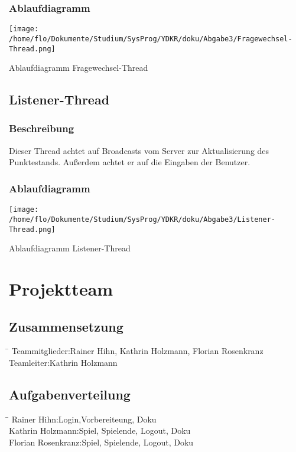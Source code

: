 \documentclass[a4paper,10pt]{article}
\begin{document}
\subsubsection{Ablaufdiagramm}

\begin{center}
 \texttt{[image: /home/flo/Dokumente/Studium/SysProg/YDKR/doku/Abgabe3/Fragewechsel-Thread.png]}
\end{center}

Ablaufdiagramm Fragewechsel-Thread

\subsection{Listener-Thread}

\subsubsection{Beschreibung}

Dieser Thread achtet auf Broadcasts vom Server zur Aktualisierung des Punktestands. Außerdem achtet er auf die Eingaben der Benutzer.

\subsubsection{Ablaufdiagramm}

\begin{center}
 \texttt{[image: /home/flo/Dokumente/Studium/SysProg/YDKR/doku/Abgabe3/Listener-Thread.png]}
\end{center}

Ablaufdiagramm Listener-Thread

\section{Projektteam}

\subsection{Zusammensetzung}

\begin{tabbing}
\hspace{3,5 cm}\=\kill
Teammitglieder:\>Rainer Hihn, Kathrin Holzmann, Florian Rosenkranz\\
Teamleiter:\>Kathrin Holzmann\\
\end{tabbing}


\subsection{Aufgabenverteilung}

\begin{tabbing}
\hspace{3,5 cm}\=\kill
Rainer Hihn:\>Login,Vorbereiteung, Doku\\
Kathrin Holzmann:\>Spiel, Spielende, Logout, Doku\\
Florian Rosenkranz:\>Spiel, Spielende, Logout, Doku\\
\end{tabbing}
\end{document}
